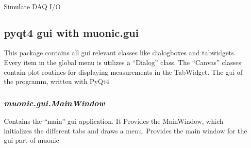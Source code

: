 \documentclass[letterpaper,10pt,english]{sphinxmanual}
\begin{document}

\begin{fulllineitems}
\label{muonic:muonic.daq.SimDaqConnection.SimDaqServer}~

\begin{fulllineitems}
\label{muonic:muonic.daq.SimDaqConnection.SimDaqServer.read}
Simulate DAQ I/O

\end{fulllineitems}


\begin{fulllineitems}
\label{muonic:muonic.daq.SimDaqConnection.SimDaqServer.serve}
\end{fulllineitems}


\begin{fulllineitems}
\label{muonic:muonic.daq.SimDaqConnection.SimDaqServer.setup_socket}
\end{fulllineitems}


\end{fulllineitems}



\subsection{pyqt4 gui with muonic.gui}
\label{muonic:pyqt4-gui-with-muonic-gui}
This package contains all gui relevant classes like dialogboxes and tabwidgets. Every item in the global menu is utilizes a ``Dialog'' class. The ``Canvas'' classes contain plot routines for displaying measurements in the TabWidget.
\label{muonic:module-muonic.gui}
The gui of the programm, written with PyQt4


\subsubsection{\emph{muonic.gui.MainWindow}}
\label{muonic:muonic-gui-mainwindow}
Contains the  ``main'' gui application. It Provides the MainWindow, which initializes the different tabs and draws a menu.
\label{muonic:module-muonic.gui.MainWindow}
Provides the main window for the gui part of muonic
\end{document}
